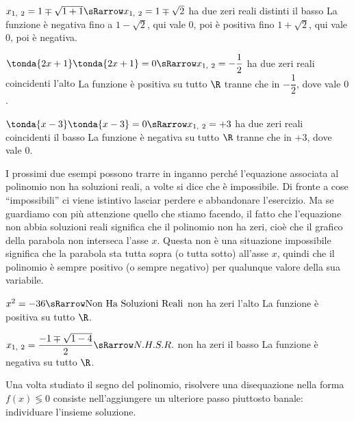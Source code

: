 {\(x_{1,~2} = 1 \mp \sqrt{1+1} \sRarrow x_{1,~2} =1 \mp \sqrt{2}\)}
{ha due zeri reali distinti}
{il basso}
{}
{La funzione è negativa fino a \(1-\sqrt{2}\), qui vale \(0\), poi è 
positiva fino \(1+\sqrt{2}\), qui vale \(0\), poi è negativa.}

{\(\tonda{2x+1}\tonda{2x+1} = 0 \sRarrow x_{1,~2} = -\dfrac{1}{2}\)}
{ha due zeri reali coincidenti}
{l'alto}
{}
{La funzione è positiva su tutto \(\R\) tranne che in \(-\dfrac{1}{2}\), 
dove vale \(0\).}

{\(\tonda{x-3}\tonda{x-3} = 0 \sRarrow x_{1,~2} = +3\)}
{ha due zeri reali coincidenti}
{il basso}
{}
{La funzione è negativa su tutto \(\R\) tranne che in \(+3\), 
dove vale \(0\).}

I prossimi due esempi possono trarre in inganno perché l'equazione 
associata al polinomio non ha soluzioni reali, a volte si dice che è 
impossibile. 
Di fronte a cose ``impossibili'' ci viene istintivo lasciar perdere e
abbandonare l'esercizio.
Ma se guardiamo con più attenzione quello che stiamo facendo, il fatto che 
l'equazione non abbia soluzioni reali significa che il polinomio non ha 
zeri, cioè che il grafico della parabola non interseca l'asse \(x\).
Questa non è una situazione impossibile significa che la parabola sta tutta 
sopra (o tutta sotto) all'asse \(x\), quindi che il polinomio è sempre 
positivo (o sempre negativo) per qualunque valore della sua variabile. 

{\(x^2 = -36 \sRarrow \text{Non Ha Soluzioni Reali}\)}
{non ha zeri}
{l'alto}
{\segniparaui{+}}
{La funzione è positiva su tutto \(\R\).}

{\(x_{1,~2} = \dfrac{-1 \mp \sqrt{1-4}}{2} \sRarrow N.H.S.R.\)}
{non ha zeri}
{il basso}
{\segniparadi{-}}
{La funzione è negativa su tutto \(\R\).}

Una volta studiato il segno del polinomio, risolvere una disequazione nella 
forma \(f(x) \lessgtr 0\) consiste nell'aggiungere un ulteriore passo 
piuttosto banale: individuare l'insieme soluzione.

\newcommand{\esebasedis}[4]{%
\begin{esempio}{}{}
Risolvi la disequazione: \quad #1

\begin{enumerate}[left=0mm]
\item Equazione Associata: \quad #2 \\
\item #3
\item #4
\end{enumerate}
\end{esempio}
}

